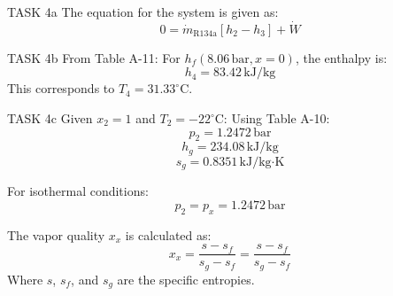 TASK 4a  
The equation for the system is given as:  
\[
0 = \dot{m}_{\text{R134a}} \left[ h_2 - h_3 \right] + \dot{W}
\]

TASK 4b  
From Table A-11:  
For \( h_f(8.06 \, \text{bar}, x = 0) \), the enthalpy is:  
\[
h_4 = 83.42 \, \text{kJ/kg}
\]  
This corresponds to \( T_4 = 31.33^\circ\text{C} \).

TASK 4c  
Given \( x_2 = 1 \) and \( T_2 = -22^\circ\text{C} \):  
Using Table A-10:  
\[
p_2 = 1.2472 \, \text{bar}
\]  
\[
h_g = 234.08 \, \text{kJ/kg}
\]  
\[
s_g = 0.8351 \, \text{kJ/kg·K}
\]

For isothermal conditions:  
\[
p_2 = p_x = 1.2472 \, \text{bar}
\]

The vapor quality \( x_x \) is calculated as:  
\[
x_x = \frac{s - s_f}{s_g - s_f} = \frac{s - s_f}{s_g - s_f}
\]  
Where \( s \), \( s_f \), and \( s_g \) are the specific entropies.